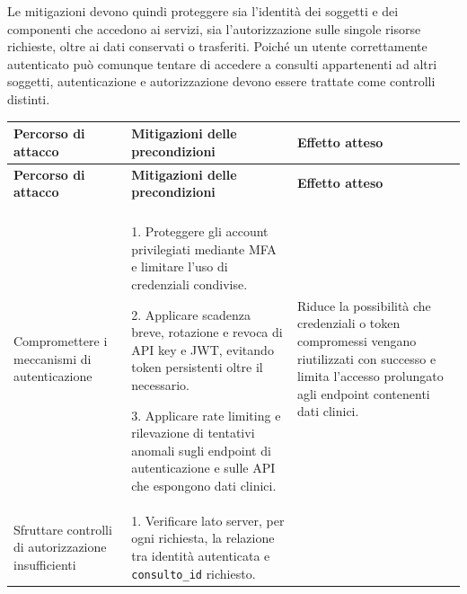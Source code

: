 Le mitigazioni devono quindi proteggere sia l'identità dei soggetti e dei
componenti che accedono ai servizi, sia l'autorizzazione sulle singole risorse
richieste, oltre ai dati conservati o trasferiti. Poiché un utente correttamente
autenticato può comunque tentare di accedere a consulti appartenenti ad altri
soggetti, autenticazione e autorizzazione devono essere trattate come controlli
distinti.

{
\small
{}
\setlength{\tabcolsep}{4pt}
\renewcommand{\arraystretch}{1.07}

\begin{xltabular}{\textwidth}{
    >{\raggedright\arraybackslash}p{3.1cm}
    X
    X
}

\toprule

\textbf{Percorso di attacco} &
\textbf{Mitigazioni delle precondizioni} &
\textbf{Effetto atteso} \\

\midrule

\endfirsthead

\toprule

\textbf{Percorso di attacco} &
\textbf{Mitigazioni delle precondizioni} &
\textbf{Effetto atteso} \\

\midrule

\endhead

 \\
\endfoot

\endlastfoot


Compromettere i meccanismi di autenticazione &

1. Proteggere gli account privilegiati mediante MFA e limitare l'uso di
credenziali condivise.

2. Applicare scadenza breve, rotazione e revoca di API key e JWT, evitando
token persistenti oltre il necessario.

3. Applicare rate limiting e rilevazione di tentativi anomali sugli endpoint
di autenticazione e sulle API che espongono dati clinici. &

Riduce la possibilità che credenziali o token compromessi vengano riutilizzati
con successo e limita l'accesso prolungato agli endpoint contenenti dati
clinici. \\

\midrule


Sfruttare controlli di autorizzazione insufficienti &

1. Verificare lato server, per ogni richiesta, la relazione tra identità
autenticata e \texttt{consulto\_id} richiesto.


\end{xltabular}}
